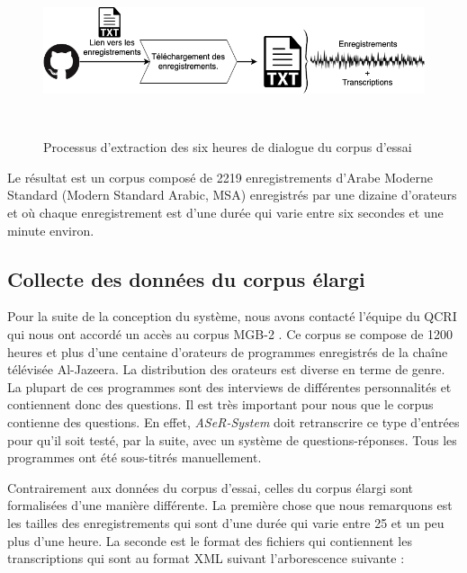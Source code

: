 \begin{figure}[H]
    \centering
    \includegraphics[height=140pt,width=450pt]{images/chap3/QCRI-6h-Github.png}
    \caption{Processus d'extraction des six heures de dialogue du corpus d'essai}
    \label{QCRI6}
\end{figure}

Le résultat est un corpus composé de 2219 enregistrements d'Arabe Moderne Standard (Modern Standard Arabic, MSA) enregistrés par une dizaine d'orateurs et où chaque enregistrement est d'une durée qui varie entre six secondes et une minute environ.

\subsection{Collecte des données du corpus élargi}\label{collecte_donnees}
Pour la suite de la conception du système, nous avons contacté l'équipe du QCRI qui nous ont accordé un accès au corpus MGB-2 \cite{mgb2corpus}. Ce corpus se compose de 1200 heures et plus d'une centaine d'orateurs de programmes enregistrés de la chaîne télévisée Al-Jazeera. La distribution des orateurs est diverse en terme de genre. La plupart de ces programmes sont des interviews de différentes personnalités et contiennent donc des questions. Il est très important pour nous que le corpus contienne des questions. En effet, \textit{ASeR-System} doit retranscrire ce type d'entrées pour qu'il soit testé, par la suite, avec un système de questions-réponses.  Tous les programmes ont été sous-titrés manuellement. 

Contrairement aux données du corpus d'essai, celles du corpus élargi sont formalisées d'une manière différente. La première chose que nous remarquons est les tailles des enregistrements qui sont d'une durée qui varie entre 25 et un peu plus d'une heure. La seconde est le format des fichiers qui contiennent les transcriptions qui sont au format XML suivant l'arborescence suivante : \\

